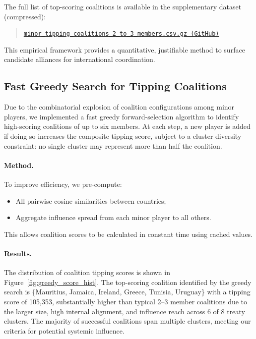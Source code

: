 \documentclass[11pt]{article}
\begin{document}
The full list of top-scoring coalitions is available in the supplementary dataset (compressed):
\begin{quote}
	\href{https://github.com/its-not-rocket-science/tensor-based-game-theory-identifying-critical-coalitions-climate-change-negotiations/blob/main/outputs/minor_tipping_coalitions_2_to_3_members.csv.gz}{\texttt{minor\_tipping\_coalitions\_2\_to\_3\_members.csv.gz (GitHub)}}
\end{quote}

This empirical framework provides a quantitative, justifiable method to surface candidate alliances for international coordination.

\subsection{Fast Greedy Search for Tipping Coalitions}
\label{sec:greedy_coalitions}

Due to the combinatorial explosion of coalition configurations among minor players, we implemented a fast greedy forward-selection algorithm to identify high-scoring coalitions of up to six members. At each step, a new player is added if doing so increases the composite tipping score, subject to a cluster diversity constraint: no single cluster may represent more than half the coalition.

\paragraph{Method.}
To improve efficiency, we pre-compute:
\begin{itemize}
	\item All pairwise cosine similarities between countries;
	\item Aggregate influence spread from each minor player to all others.
\end{itemize}

This allows coalition scores to be calculated in constant time using cached values.

\paragraph{Results.}
The distribution of coalition tipping scores is shown in Figure~\ref{fig:greedy_score_hist}. The top-scoring coalition identified by the greedy search is \{Mauritius, Jamaica, Ireland, Greece, Tunisia, Uruguay\} with a tipping score of 105{,}353, substantially higher than typical 2--3 member coalitions due to the larger size, high internal alignment, and influence reach across 6 of 8 treaty clusters. The majority of successful coalitions span multiple clusters, meeting our criteria for potential systemic influence.
\end{document}

